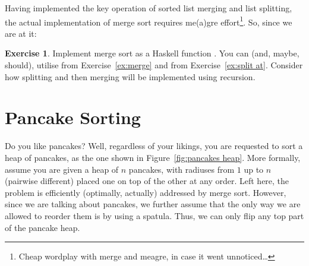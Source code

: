 \documentclass[a4paper]{tufte-handout}
\theoremstyle{definition}
\newtheorem{exercise}{Exercise}
\begin{document}
	\begin{marginfigure}
		\centering
		\caption{Sorted list merging. A typical imperative implementation would invoke a loop over both lists, using appropriate indices for each list. What about recursion?}
		\label{fig:sorted list merging}
	\end{marginfigure}
	
	Having implemented the key operation of sorted list merging and list splitting, the actual implementation of merge sort requires me(a)gre effort\footnote{Cheap wordplay with merge and meagre, in case it went unnoticed\ldots}. So, since we are at it:
	\begin{exercise}\label{ex:merge sort}
		Implement merge sort as a Haskell function . You can (and, maybe, should), utilise  from Exercise~\ref{ex:merge} and  from Exercise~\ref{ex:split at}. Consider how splitting and then merging will be implemented using recursion.
	\end{exercise}
	\section{Pancake Sorting}
	Do you like pancakes? Well, regardless of your likings, you are requested to sort a heap of pancakes, as the one shown in Figure~\ref{fig:pancakes heap}. More formally, assume you are given a heap of $n$ pancakes, with radiuses from $1$ up to $n$ (pairwise different) placed one on top of the other at any order. Left here, the problem is efficiently (optimally, actually) addressed by merge sort. However, since we are talking about pancakes, we further assume that the only way we are allowed to reorder them is by using a spatula. Thus, we can only flip any top part of the pancake heap.
	
\end{document}
